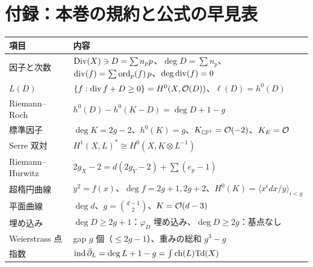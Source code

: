 \section*{付録：本巻の規約と公式の早見表}
\begin{center}
\begin{tabular}{p{}p{}}
\toprule
項目 & 内容\\
\midrule
因子と次数 & $\mathrm{Div}(X)\ni D=\sum n_pp$、$\deg D=\sum n_p$、$\operatorname{div}(f)=\sum\operatorname{ord}_p(f)\,p$、$\deg\operatorname{div}(f)=0$\\
$L(D)$ & $\{f:\operatorname{div} f+D\ge0\}=H^0(X,\mathcal O(D))$、$\ell(D)=h^0(D)$\\
Riemann--Roch & $h^0(D)-h^0(K-D)=\deg D+1-g$\\
標準因子 & $\deg K=2g-2$、$h^0(K)=g$、$K_{\mathbb{CP}^1}=\mathcal O(-2)$、$K_E=\mathcal O$\\
Serre 双対 & $H^1(X,L)^*\cong H^0(X,K\otimes L^{-1})$\\
Riemann--Hurwitz & $2g_X-2=d(2g_Y-2)+\sum(e_p-1)$\\
超楕円曲線 & $y^2=f(x)$、$\deg f=2g+1,2g+2$、$H^0(K)=\langle x^idx/y\rangle_{i<g}$\\
平面曲線 & $\deg d$、$g=\binom{d-1}2$、$K=\mathcal O(d-3)$\\
埋め込み & $\deg D\ge2g+1$：$\varphi_D$ 埋め込み、$\deg D\ge2g$：基点なし\\
Weierstrass 点 & gap $g$ 個（$\le2g-1$）、重みの総和 $g^3-g$\\
指数 & $\mathrm{ind}\,\bar\partial_L=\deg L+1-g=\int\mathrm{ch}(L)\mathrm{Td}(X)$\\
\bottomrule
\end{tabular}
\end{center}

